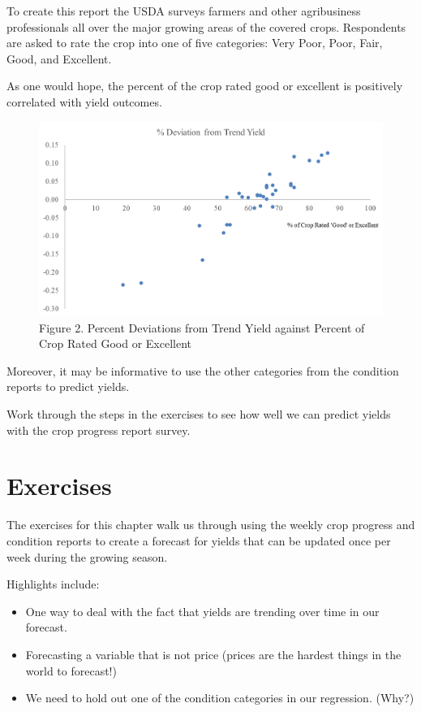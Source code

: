 \documentclass[
  letterpaper,
  DIV=11,
  numbers=noendperiod]{scrreprt}
\providecommand{\tightlist}{%
  \setlength{\itemsep}{0pt}\setlength{\parskip}{0pt}}\usepackage{longtable,booktabs,array}
\begin{document}
To create this report the USDA surveys farmers and other agribusiness
professionals all over the major growing areas of the covered crops.
Respondents are asked to rate the crop into one of five categories: Very
Poor, Poor, Fair, Good, and Excellent.

As one would hope, the percent of the crop rated good or excellent is
positively correlated with yield outcomes.

\begin{figure}

{\centering \includegraphics{Excel-files/yied-forecast-advanced_files/image001.png}

}

\caption{Figure 2. Percent Deviations from Trend Yield against Percent
of Crop Rated Good or Excellent}

\end{figure}

Moreover, it may be informative to use the other categories from the
condition reports to predict yields.

Work through the steps in the exercises to see how well we can predict
yields with the crop progress report survey.

\hypertarget{exercises-9}{%
\section{Exercises}\label{exercises-9}}

The exercises for this chapter walk us through using the weekly crop
progress and condition reports to create a forecast for yields that can
be updated once per week during the growing season.

Highlights include:

\begin{itemize}
\tightlist
\item
  One way to deal with the fact that yields are trending over time in
  our forecast.
\item
  Forecasting a variable that is not price (prices are the hardest
  things in the world to forecast!)
\item
  We need to hold out one of the condition categories in our regression.
  (Why?)
\end{itemize}
\end{document}
